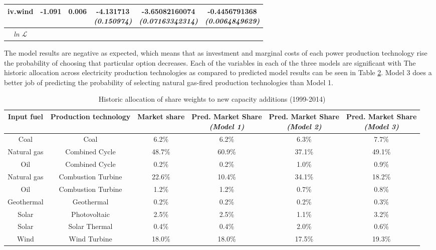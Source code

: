 \documentclass[10pt]{amsart}
\begin{document}
\begin{table}[H]
\begin{tabular}{c c c c c c}
iv.wind & -1.091 & 0.006 & \makecell{-4.131713 \\ {\footnotesize\textit{(0.150974)}}} & \makecell{-3.65082160074 \\ {\footnotesize\textit{(0.07163342314)}}} & \makecell{-0.4456791368 \\ {\footnotesize\textit{(0.0064849629)}}} \\ 
\hline
\textit{ln} $\mathcal{L}$ & & & \\ [1ex]
\hline
\hline
\end{tabular}
\label{table:nl.1}
\end{table}

The model results are negative as expected, which means that as investment and marginal costs of each power production technology rise the probability of choosing that particular option decreases. 
Each of the variables in each of the three models are significant with 
The historic allocation across electricity production technologies as compared to predicted model results can be seen in Table \ref{table:perc}.
Model 3 does a better job of predicting the probability of selecting natural gas-fired production technologies than Model 1.  

\begin{table}[H]
\caption{Historic allocation of share weights to new capacity additions (1999-2014)}
\centering
\begin{tabular}{c c c c c c}
\hline
\hline
Input fuel & Production technology & Market share & \makecell{Pred. Market Share \\ {\footnotesize\textit{(Model 1)}}} & \makecell{Pred. Market Share \\ {\footnotesize\textit{(Model 2)}}} & \makecell{Pred. Market Share \\ {\footnotesize\textit{(Model 3)}}} \\ [0.5ex]
\hline
Coal & Coal & 6.2\% & 6.2\% &6.3\% &7.7\% \\
Natural gas & Combined Cycle & 48.7\% & 60.9\% & 37.1\% & 49.1\% \\
Oil & Combined Cycle & 0.2\% & 0.2\% & 1.0\% & 0.9\% \\
Natural gas & Combustion Turbine & 22.6\% & 10.4\% & 34.1\% & 18.2\%\\
Oil & Combustion Turbine & 1.2\% & 1.2\% & 0.7\% & 0.8\% \\
Geothermal & Geothermal & 0.2\% & 0.2\% & 0.2\% & 0.3\% \\
Solar & Photovoltaic & 2.5\% & 2.5\% & 1.1\% & 3.2\%\\
Solar & Solar Thermal & 0.4\% & 0.4\% & 2.0\% & 0.6\%\\
Wind & Wind Turbine & 18.0\% & 18.0\% & 17.5\% & 19.3\% \\ [1ex]
\hline
\end{tabular}
\label{table:perc}
\end{table}
\end{document}
